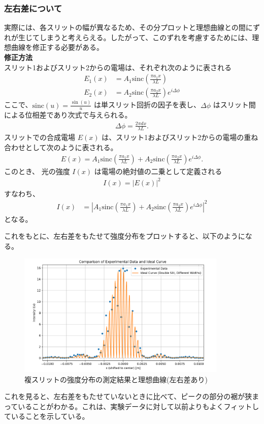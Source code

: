 \documentclass[a4paper,11pt]{jsarticle}
\begin{document}
\subsubsection{左右差について}
実際には、各スリットの幅が異なるため、その分プロットと理想曲線との間にずれが生じてしまうと考えらえる。したがって、このずれを考慮するためには、理想曲線を修正する必要がある。\\
\textbf{修正方法}\\
スリット1およびスリット2からの電場は、それぞれ次のように表される
\begin{align}
    E_1(x) &= A_1 \mathrm{sinc} \left( \frac{\pi a_1 x}{\lambda L} \right) \\
    E_2(x) &= A_2 \mathrm{sinc} \left( \frac{\pi a_2 x}{\lambda L} \right) e^{i \Delta \phi}
\end{align}
ここで、\(\mathrm{sinc}(u) = \frac{\sin(u)}{u}\) は単スリット回折の因子を表し、\(\Delta \phi\) はスリット間による位相差であり次式で与えられる。
\begin{align}
    \Delta \phi = \frac{2\pi d x}{\lambda L}.
\end{align}
スリットでの合成電場 \(E(x)\) は、スリット1およびスリット2からの電場の重ね合わせとして次のように表される。
\begin{align}
    E(x) = A_1 \mathrm{sinc} \left( \frac{\pi a_1 x}{\lambda L} \right) + A_2 \mathrm{sinc} \left( \frac{\pi a_2 x}{\lambda L} \right) e^{i \Delta \phi}.
\end{align}
このとき、
光の強度 \(I(x)\) は電場の絶対値の二乗として定義される
\begin{align}
    I(x) = |E(x)|^2
\end{align}
すなわち、
\begin{align}
    I(x) &= \left| A_1 \mathrm{sinc} \left( \frac{\pi a_1 x}{\lambda L} \right) + A_2 \mathrm{sinc} \left( \frac{\pi a_2 x}{\lambda L} \right) e^{i \Delta \phi} \right|^2
\end{align}
となる。

これをもとに、左右差をもたせて強度分布をプロットすると、以下のようになる。
\begin{figure}[H]
    \begin{center}
    \includegraphics[width=100mm]{huku2.png}
    \end{center}
    \caption{複スリットの強度分布の測定結果と理想曲線(左右差あり)}
    \label{fig:huku2}
\end{figure}
これを見ると、左右差をもたせていないときに比べて、ピークの部分の裾が狭まっていることがわかる。これは、実験データに対して以前よりもよくフィットしていることを示している。
\end{document}
